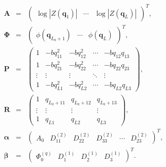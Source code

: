 \documentclass[authoryear,preprint,12pt]{elsarticle}
\newcommand{\q}{\mathbf{q}}
\newcommand{\bld}[1]{\mathbf{#1}}
\newcommand{\bs}[1]{\boldsymbol{#1}}
\begin{document}
\begin{eqnarray}
\nonumber
  \bld{A} &=& \begin{pmatrix} 
    \log\left|Z(\q_1)\right| & \cdots & \log\left|Z(\q_L)\right| 
  \end{pmatrix}^T,\\
  \nonumber
  \bld{\Phi} &=& \begin{pmatrix} 
    \phi(\q_{L_0+1}) & \cdots & \phi(\q_L) 
  \end{pmatrix}^T,\\
  \nonumber
  \bld{P} &=& \begin{pmatrix} 
    1 & -b q_{11}^2 & -b q_{12}^2 & \cdots & -b q_{12} q_{13}\\
    1 & -b q_{21}^2 & -b q_{22}^2 & \cdots & -b q_{22} q_{23}\\
    \vdots & \vdots & \vdots & \ddots & \vdots\\
    1 & -b q_{L1}^2 & -b q_{L2}^2 & \cdots & -b q_{L2} q_{L3}
  \end{pmatrix},\\
  \nonumber
  \bld{R} &=& \begin{pmatrix} 
    1 &  q_{L_0+11} & q_{L_0+12} & q_{L_0+13}\\
    \vdots & \vdots & \vdots & \vdots\\
    1 &  q_{L1} & q_{L2} & q_{L3}
  \end{pmatrix},\\ %
  \label{imaginarydir}
  \bs{\alpha} &=& \begin{pmatrix} 
    A_0  & D_{11}^{(2)} & D_{22}^{(2)} & D_{33}^{(2)} & \cdots & D_{23}^{(2)}
  \end{pmatrix}^T,\\
  \bs{\beta} &=& \begin{pmatrix} 
    \Phi_0^{(q)}  & D_1^{(1)} & D_2^{(1)} & D_3^{(1)}
  \end{pmatrix}^T. %
\end{eqnarray}
\end{document}
